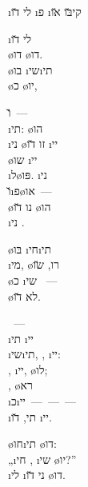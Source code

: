\textheader%
{ \i{לי} \u{דו}}
{}
{}
{\i{פ} }
{\i{קי}\u{בּו} \u{או}}
{}
{}

\begin{twocol}
\begin{stanza}
 \i{לי} \u{דו}\\
\o{דו} \o{דו}.\\
\o{בו} \i{שי}\i{תי}\\
\o{כ} \o{יו},
\end{stanza}

\begin{stanza}
\u{ו}~—\\
\i{תי}: \o{הו}\\
\i{ני} \o{זו} \u{דו} \i{יי}\\
\o{שו}  \i{יי}\\
\i{ל}\o{פּו}. \i{ני} \\
\u{ו}\i{פ}\o{או}~—\\
\o{נו} \u{דו}  \o{הו}\\
\i{ני} .
\end{stanza}

\begin{stanza}
\o{בּו} \i{חי}\i{תי} \\
\i{מי}, \o{רו}, \u{שו}\\
 \o{כ} \i{שי}{\gnuvah} ~—\\
\o{לא}  \u{דו}.
\end{stanza}

\begin{stanza}
~—\\
\i{תי} \i{יי}\\
\i{שי}\i{תי}, , \i{יי}:\\
, \i{יי}, \o{לו};\\
,  \o{רא}\\
\i{כ}\i{יי}~—~—~—\\
\i{תי},  \u{דו} \i{יי}.
\end{stanza}

\begin{stanza}
 \o{חו}\i{תי} \o{דו}:\\
„\i{חי} ,  \i{שי} \o{יו}?”\\
 \i{לי} \i{ני} \u{דו} \o{דו}.
\end{stanza}
\end{twocol}
